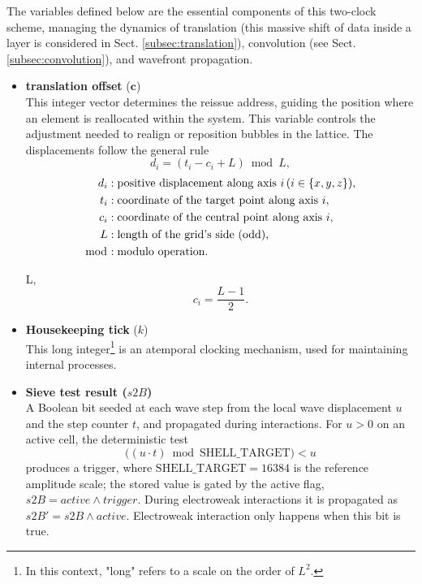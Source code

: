 \documentclass{ijuc}
\begin{document}
The variables defined below are the essential components of this two-clock scheme, managing the dynamics of translation (this massive shift of data inside a layer is considered in Sect. \ref{subsec:translation}), convolution (see Sect. \ref{subsec:convolution}), and wavefront propagation.
\begin{itemize}
    \item \textbf{translation offset} ($\textbf{c}$)\\
 This integer vector determines the reissue address, guiding the position where an element is reallocated within the system. This variable controls the adjustment needed to realign or reposition bubbles in the lattice. The displacements follow the general rule
 \[
d_i = (t_i - c_i + L) \bmod L,
\]
\begin{align*}
d_i & : \text{positive displacement along axis } i \, (i \in \{x, y, z\}), \\
t_i & : \text{coordinate of the target point along axis } i, \\
c_i & : \text{coordinate of the central point along axis } i, \\
L & : \text{length of the grid's side (odd)}, \\
\bmod & : \text{modulo operation}.
\end{align*}

 L, 
\[
c_i = \frac{L - 1}{2}.
\]

    \item \textbf{Housekeeping tick} ($k$)\\
 This long integer\footnote{In this context, "long" refers to a scale on the order of $L^2$.} is an atemporal clocking mechanism, used for maintaining internal processes.
 
   \item \textbf{Sieve test result ($s2B$)} \\
    A Boolean bit seeded at each wave step from the local wave displacement $u$ and the step counter $t$, and propagated during interactions. For $u>0$ on an active cell, the deterministic test
    \[
    \bigl((u \cdot t) \bmod \mathrm{SHELL\_TARGET}\bigr) < u
    \]
    produces a trigger, where $\mathrm{SHELL\_TARGET}=16384$ is the reference amplitude scale; the stored value is gated by the active flag, $s2B = \mathit{active} \land \mathit{trigger}$. During electroweak interactions it is propagated as $s2B' = s2B \land \mathit{active}$. Electroweak interaction only happens when this bit is true.
    

\end{itemize}
\end{document}
